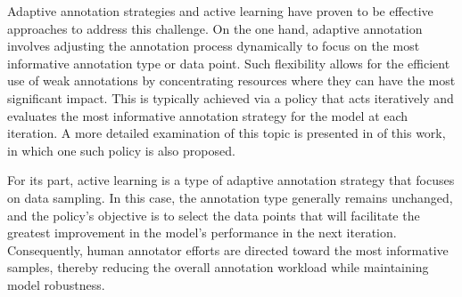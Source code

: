 Adaptive annotation strategies and active learning have proven to be effective approaches to address this challenge. On the one hand, adaptive annotation involves adjusting the annotation process dynamically to focus on the most informative annotation type or data point. Such flexibility allows for the efficient use of weak annotations by concentrating resources where they can have the most significant impact. This is typically achieved via a policy that acts iteratively and evaluates the most informative annotation strategy for the model at each iteration. A more detailed examination of this topic is presented in  of this work, in which one such policy is also proposed.

For its part, active learning is a type of adaptive annotation strategy that focuses on data sampling. In this case, the annotation type generally remains unchanged, and the policy's objective is to select the data points that will facilitate the greatest improvement in the model's performance in the next iteration. Consequently, human annotator efforts are directed toward the most informative samples, thereby reducing the overall annotation workload while maintaining model robustness.


